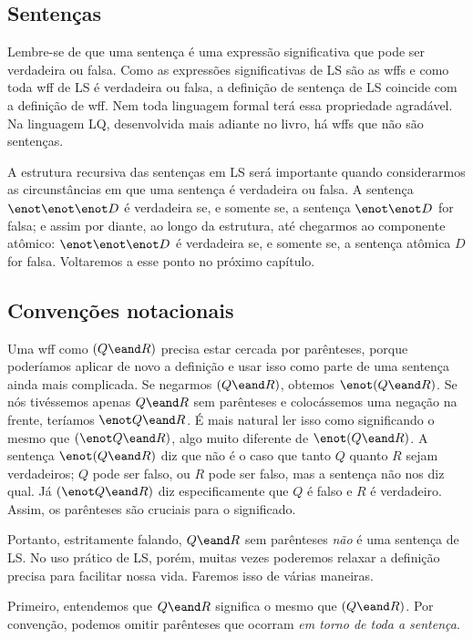 \subsection{Sentenças}
Lembre-se de que uma sentença é uma expressão significativa que pode ser verdadeira ou falsa. Como as expressões significativas de LS são as wffs e como toda wff de LS é verdadeira ou falsa, a definição de sentença de LS coincide com a definição de wff. Nem toda linguagem formal terá essa propriedade agradável. Na linguagem LQ, desenvolvida mais adiante no livro, há wffs que não são sentenças.

A estrutura recursiva das sentenças em LS será importante quando considerarmos as circunstâncias em que uma sentença é verdadeira ou falsa. A sentença $\enot \enot \enot D$ é verdadeira se, e somente se, a sentença $\enot \enot D$ for falsa; e assim por diante, ao longo da estrutura, até chegarmos ao componente atômico: $\enot \enot \enot D$ é verdadeira se, e somente se, a sentença atômica $D$ for falsa. Voltaremos a esse ponto no próximo capítulo.


\subsection{Convenções notacionais}
\label{LSconventions}
Uma wff como $(Q \eand R)$ precisa estar cercada por parênteses, porque poderíamos aplicar de novo a definição e usar isso como parte de uma sentença ainda mais complicada. Se negarmos $(Q \eand R)$, obtemos $\enot(Q \eand R)$. Se nós tivéssemos apenas $Q \eand R$ sem parênteses e colocássemos uma negação na frente, teríamos $\enot Q \eand R$. É mais natural ler isso como significando o mesmo que $(\enot Q \eand R)$, algo muito diferente de $\enot(Q\eand R)$. A sentença $\enot(Q \eand R)$ diz que não é o caso que tanto $Q$ quanto $R$ sejam verdadeiros; $Q$ pode ser falso, ou $R$ pode ser falso, mas a sentença não nos diz qual. Já $(\enot Q \eand R)$ diz especificamente que $Q$ é falso e $R$ é verdadeiro. Assim, os parênteses são cruciais para o significado.

Portanto, estritamente falando, $Q \eand R$ sem parênteses \emph{não} é uma sentença de LS. No uso prático de LS, porém, muitas vezes poderemos relaxar a definição precisa para facilitar nossa vida. Faremos isso de várias maneiras.

Primeiro, entendemos que $Q \eand R$ significa o mesmo que $(Q \eand R)$. Por convenção, podemos omitir parênteses que ocorram \emph{em torno de toda a sentença}.

